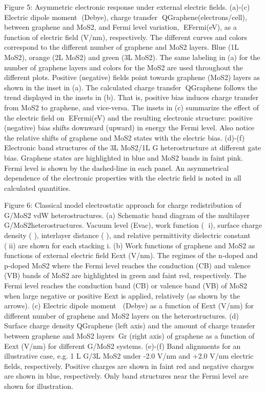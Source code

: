 Figure 5: Asymmetric electronic response under external electric fields. (a)-(c) Electric dipole moment (Debye), charge transfer QGraphene(electrons/cell), between graphene and MoS2, and Fermi level variation, EFermi(eV), as a function of electric field (V/nm), respectively. The different curves and colors correspond to the different number of graphene and MoS2 layers. Blue (1L MoS2), orange (2L MoS2) and green (3L MoS2). The same labeling in (a) for the number of graphene layers and colors for the MoS2 are used throughout the different plots. Positive (negative) fields point towards graphene (MoS2) layers as shown in the inset in (a). The calculated charge transfer QGraphene follows the trend displayed in the insets in (b).  That is, positive bias induces charge transfer from MoS2 to graphene, and vice-versa. The insets in (c) summarize the effect of the electric field on EFermi(eV) and the resulting electronic structure: positive (negative) bias shifts downward (upward) in energy the Fermi level. Also notice the relative shifts of graphene and MoS2 states with the electric bias. (d)-(f) Electronic band structures of the 3L MoS2/1L G heterostructure at different gate bias. Graphene states are highlighted in blue and MoS2 bands in faint pink. Fermi level is shown by the dashed-line in each panel. An asymmetrical dependence of the electronic properties with the electric field is noted in all calculated quantities. 

 
Figure 6: Classical model electrostatic approach for charge redistribution of G/MoS2 vdW heterostructures. (a) Schematic band diagram of the multilayer G/MoS2heterostructures. Vacuum level (Evac), work function ( i), surface charge density ( ), interlayer distance ( ),  and relative permittivity dielectric constant (ii) are shown for each stacking i. (b) Work functions of graphene and MoS2 as functions of external electric field Eext (V/nm). The regimes of the n-doped and p-doped MoS2 where the Fermi level reaches the conduction (CB) and valence (VB) bands of MoS2 are highlighted in green and faint red, respectively. The Fermi level reaches the conduction band (CB) or valence band (VB) of MoS2 when large negative or positive Eext is applied, relatively (as shown by the arrows). (c) Electric dipole moment  (Debye) as a function of Eext (V/nm) for different number of graphene and MoS2 layers on the heterostructures. (d) Surface charge density QGraphene (left axis) and the amount of charge transfer between graphene and MoS2 layersGr (right axis) of graphene as a function of Eext (V/nm) for different G/MoS2 systems. (e)-(f) Band alignments for an illustrative case, e.g. 1 L G/3L MoS2 under -2.0 V/nm and +2.0 V/nm electric fields, respectively. Positive charges are shown in faint red and negative charges are shown in blue, respectively. Only band structures near the Fermi level are shown for illustration. 
 
